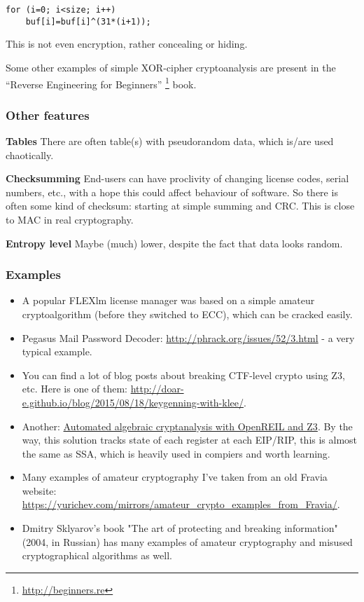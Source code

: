 \begin{lstlisting}
for (i=0; i<size; i++)
    buf[i]=buf[i]^(31*(i+1));
\end{lstlisting}

This is not even encryption, rather concealing or hiding.

Some other examples of simple XOR-cipher cryptoanalysis are present in the ``Reverse Engineering for Beginners''
\footnote{\url{http://beginners.re}} book.

\subsubsection{Other features}

\textbf{Tables} There are often table(s) with pseudorandom data, which is/are used chaotically.

\textbf{Checksumming} End-users can have proclivity of changing license codes, serial numbers, etc., with a hope
this could affect behaviour of software.
So there is often some kind of checksum: starting at simple summing and \ac{CRC}.
This is close to \ac{MAC} in real cryptography.

\textbf{Entropy level} Maybe (much) lower, despite the fact that data looks random.

\subsubsection{Examples}

\begin{itemize}

\item A popular FLEXlm license manager was based on a simple amateur cryptoalgorithm
(before they switched to \ac{ECC}), which can be cracked easily.

\item Pegasus Mail Password Decoder: \url{http://phrack.org/issues/52/3.html} -
a very typical example.

\item You can find a lot of blog posts about breaking \ac{CTF}-level crypto using Z3, etc.
Here is one of them: \url{http://doar-e.github.io/blog/2015/08/18/keygenning-with-klee/}.

\item Another: \href{http://blog.cr4.sh/2015/03/automated-algebraic-cryptanalysis-with.html}{Automated algebraic cryptanalysis with OpenREIL and Z3}.
By the way, this solution tracks state of each register at each EIP/RIP,
this is almost the same as \ac{SSA}, which is heavily used in compiers and worth learning.

\item Many examples of amateur cryptography I've taken from an old Fravia website:
\url{https://yurichev.com/mirrors/amateur_crypto_examples_from_Fravia/}.

\item Dmitry Sklyarov's book "The art of protecting and breaking information" (2004, in Russian) has many examples of amateur cryptography and 
misused cryptographical algorithms as well.

\end{itemize}




